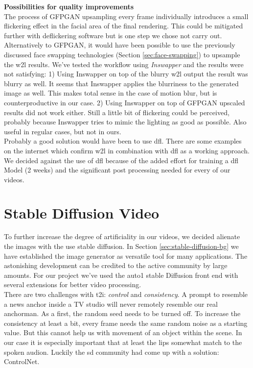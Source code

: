 \documentclass[
  a4paper,  %
  twoside,  %
  bibliography=totoc,
  headsepline,
  cleardoublepage=empty,
  parskip=half,
  draft=false
]{scrbook}
\begin{document}
\textbf{Possibilities for quality improvements} \\
The process of GFPGAN upsampling every frame individually introduces a small flickering effect in the facial area of the final rendering. This could be mitigated further with deflickering software but is one step we chose not carry out. \\ Alternatively to GFPGAN, it would have been possible to use the previously discussed face swapping technologies (Section \ref{sec:face-swapping}) to upsample the \gls{w2l} results. We've tested the workflow using \textit{Inswapper} and the results were not satisfying: 1) Using Inswapper on top of the blurry \gls{w2l} output the result was blurry as well. It seems that Inswapper applies the blurriness to the generated image as well. This makes total sense in the case of motion blur, but is counterproductive in our case. 2) Using Inswapper on top of GFPGAN upscaled results did not work either. Still a little bit of flickering could be perceived, probably because Inswapper tries to mimic the lighting as good as possible. Also useful in regular cases, but not in ours. \\
Probably a good solution would have been to use \gls{dfl}. There are some examples on the internet which confirm \gls{w2l} in combination with \gls{dfl} as a working approach. We decided against the use of \gls*{dfl} because of the added effort for training a \gls{dfl} Model (2 weeks) and the significant post processing needed for every of our videos. 


\section{Stable Diffusion Video}
\label{sec:sd-video}
To further increase the degree of artificiality in our videos, we decided alienate the images with the use stable diffusion. In Section \ref{sec:stable-diffusion-bg} we have established the image generator as versatile tool for many applications. The astonishing development can be credited to the active community by large amounts. For our project we've used the \gls{auto1} stable Diffusion front end with several extensions for better video processing. \\
There are two challenges with \gls{t2i}: \textit{control} and \textit{consistency}. A prompt to resemble a news anchor inside a TV studio will never remotely resemble our real anchorman. As a first, the random seed needs to be turned off. To increase the consistency at least a bit, every frame needs the same random noise as a starting value. But this cannot help us with movement of an object within the scene. In our case it is especially important that at least the lips somewhat match to the spoken audion. Luckily the \gls{sd} community had come up with a solution: ControlNet. 
\end{document}
